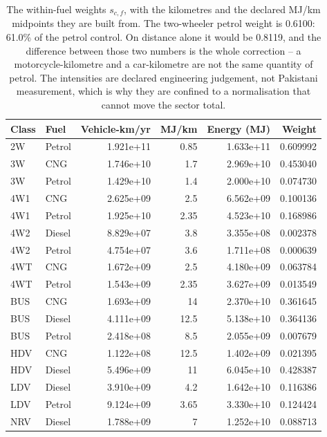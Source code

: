 \begin{table}[!htbp]
\centering
\scriptsize
\setlength{\tabcolsep}{3pt}
\begin{tabular}{@{}llrrrr@{}}
\toprule
\textbf{Class} & \textbf{Fuel} & \textbf{Vehicle-km/yr} & \textbf{MJ/km} & \textbf{Energy (MJ)} & \textbf{Weight} \\
\midrule
2W & Petrol & 1.921e+11 & 0.85 & 1.633e+11 & 0.609992 \\
3W & CNG & 1.746e+10 & 1.7 & 2.969e+10 & 0.453040 \\
3W & Petrol & 1.429e+10 & 1.4 & 2.000e+10 & 0.074730 \\
4W1 & CNG & 2.625e+09 & 2.5 & 6.562e+09 & 0.100136 \\
4W1 & Petrol & 1.925e+10 & 2.35 & 4.523e+10 & 0.168986 \\
4W2 & Diesel & 8.829e+07 & 3.8 & 3.355e+08 & 0.002378 \\
4W2 & Petrol & 4.754e+07 & 3.6 & 1.711e+08 & 0.000639 \\
4WT & CNG & 1.672e+09 & 2.5 & 4.180e+09 & 0.063784 \\
4WT & Petrol & 1.543e+09 & 2.35 & 3.627e+09 & 0.013549 \\
BUS & CNG & 1.693e+09 & 14 & 2.370e+10 & 0.361645 \\
BUS & Diesel & 4.111e+09 & 12.5 & 5.138e+10 & 0.364136 \\
BUS & Petrol & 2.418e+08 & 8.5 & 2.055e+09 & 0.007679 \\
HDV & CNG & 1.122e+08 & 12.5 & 1.402e+09 & 0.021395 \\
HDV & Diesel & 5.496e+09 & 11 & 6.045e+10 & 0.428387 \\
LDV & Diesel & 3.910e+09 & 4.2 & 1.642e+10 & 0.116386 \\
LDV & Petrol & 9.124e+09 & 3.65 & 3.330e+10 & 0.124424 \\
NRV & Diesel & 1.788e+09 & 7 & 1.252e+10 & 0.088713 \\
\bottomrule
\end{tabular}
\caption{The within-fuel weights $s_{c,f}$, with the kilometres and the declared MJ/km midpoints they are built from. The two-wheeler petrol weight is 0.6100: 61.0\% of the petrol control. On distance alone it would be 0.8119, and the difference between those two numbers is the whole correction -- a motorcycle-kilometre and a car-kilometre are not the same quantity of petrol. The intensities are declared engineering judgement, not Pakistani measurement, which is why they are confined to a normalisation that cannot move the sector total.}
\label{tab:classweights}
\end{table}

